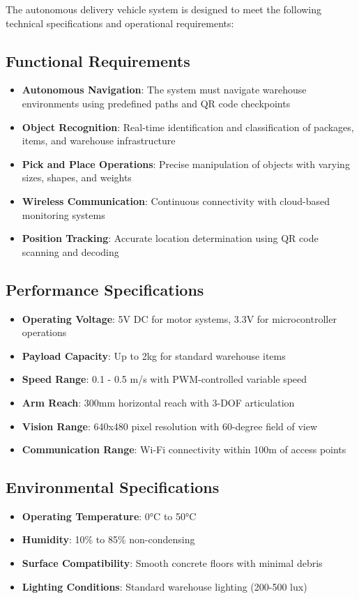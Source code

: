 The autonomous delivery vehicle system is designed to meet the following technical specifications and operational requirements:

\subsection{Functional Requirements}
\begin{itemize}
\item \textbf{Autonomous Navigation}: The system must navigate warehouse environments using predefined paths and QR code checkpoints
\item \textbf{Object Recognition}: Real-time identification and classification of packages, items, and warehouse infrastructure
\item \textbf{Pick and Place Operations}: Precise manipulation of objects with varying sizes, shapes, and weights
\item \textbf{Wireless Communication}: Continuous connectivity with cloud-based monitoring systems
\item \textbf{Position Tracking}: Accurate location determination using QR code scanning and decoding
\end{itemize}

\subsection{Performance Specifications}
\begin{itemize}
\item \textbf{Operating Voltage}: 5V DC for motor systems, 3.3V for microcontroller operations
\item \textbf{Payload Capacity}: Up to 2kg for standard warehouse items
\item \textbf{Speed Range}: 0.1 - 0.5 m/s with PWM-controlled variable speed
\item \textbf{Arm Reach}: 300mm horizontal reach with 3-DOF articulation
\item \textbf{Vision Range}: 640x480 pixel resolution with 60-degree field of view
\item \textbf{Communication Range}: Wi-Fi connectivity within 100m of access points
\end{itemize}

\subsection{Environmental Specifications}
\begin{itemize}
\item \textbf{Operating Temperature}: 0°C to 50°C
\item \textbf{Humidity}: 10\% to 85\% non-condensing
\item \textbf{Surface Compatibility}: Smooth concrete floors with minimal debris
\item \textbf{Lighting Conditions}: Standard warehouse lighting (200-500 lux)
\end{itemize}

